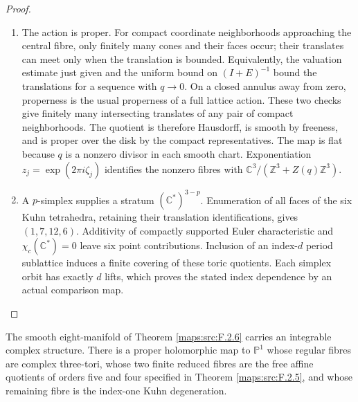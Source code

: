 \begin{proof}
\begin{enumerate}[label=\arabic*.]
\item The action is proper.  For compact coordinate neighborhoods approaching
the central fibre, only finitely many cones and their faces occur;
their translates can meet only when the translation is bounded.
Equivalently, the valuation estimate just given and the uniform bound
on $(I+E)^{-1}$ bound the translations for a sequence with $q\to0$.
On a closed annulus away from zero, properness is the usual
properness of a full lattice action.  These two checks give finitely
many intersecting translates of any pair of compact neighborhoods.
The quotient is therefore Hausdorff, is smooth by freeness, and is
proper over the disk by the compact representatives.  The map is flat
because $q$ is a nonzero divisor in each smooth chart.  Exponentiation
$z_j=\exp(2\pi i\zeta_j)$ identifies the nonzero fibres with
$\mathbb C^3/(\mathbb Z^3+Z(q)\mathbb Z^3)$.

\item A $p$-simplex supplies a stratum $(\mathbb C^*)^{3-p}$.
Enumeration of all faces of the six Kuhn tetrahedra, retaining their
translation identifications, gives $(1,7,12,6)$.
Additivity of compactly supported Euler characteristic and
$\chi_c(\mathbb C^*)=0$ leave six point contributions.
Inclusion of an index-$d$ period sublattice induces a finite covering
of these toric quotients.  Each simplex orbit has exactly $d$ lifts,
which proves the stated index dependence by an actual comparison map.

\end{enumerate}
\end{proof}




\begin{theorem}\label{maps:src:F.3.7}


The smooth eight-manifold of Theorem \ref{maps:src:F.2.6} carries an integrable
complex structure.  There is a proper holomorphic map to
$\mathbb P^1$ whose regular fibres are complex three-tori,
whose two finite reduced fibres are the free affine quotients
of orders five and four specified in Theorem \ref{maps:src:F.2.5}, and whose
remaining fibre is the index-one Kuhn degeneration.

\end{theorem}


